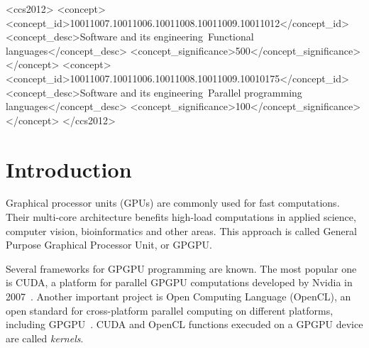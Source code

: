 \documentclass[sigplan,review]{acmart}\settopmatter{printfolios=true}
\begin{document}
\begin{CCSXML}
<ccs2012>
<concept>
<concept_id>10011007.10011006.10011008.10011009.10011012</concept_id>
<concept_desc>Software and its engineering~Functional languages</concept_desc>
<concept_significance>500</concept_significance>
</concept>
<concept>
<concept_id>10011007.10011006.10011008.10011009.10010175</concept_id>
<concept_desc>Software and its engineering~Parallel programming languages</concept_desc>
<concept_significance>100</concept_significance>
</concept>
</ccs2012>
\end{CCSXML}




\maketitle


\section{Introduction} %

Graphical processor units (GPUs) are commonly used for fast computations. Their multi-core architecture benefits high-load computations in applied science, computer vision, bioinformatics and other areas. This approach is called General Purpose Graphical Processor Unit, or GPGPU.~\cite{CUDA_to_OpenCL, GPGPU_1}

Several frameworks for GPGPU programming are known. The most popular one is CUDA, a platform for parallel GPGPU computations developed by Nvidia in 2007~\cite{CUDA}. Another important project is Open Computing Language (OpenCL), an open standard for cross-platform parallel computing on different platforms, including GPGPU~\cite{OpenCL}. CUDA and OpenCL functions execuded on a GPGPU device are called \textit{kernels}.
\end{document}
